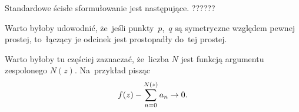 \documentclass[a4paper,11pt]{article}
\begin{document}
Standardowe ścisłe sformułowanie jest następujące. ??????

\vspace{\spaceFour}


\start {} Warto byłoby udowodnić, że~jeśli punkty~$p$,~$q$ są
symetryczne względem pewnej prostej, to~łączący je odcinek jest
prostopadły do~tej prostej.

\vspace{\spaceFour}


\start {}

\vspace{\spaceFour}


\start {} Warto byłoby tu częściej zaznaczać, że~liczba $N$ jest funkcją argumentu zespolonego $N( z )$. Na~przykład pisząc
\begin{equation}
  \label{eq:Leja-30}
  \begin{split}
    f( z ) - \sum\limits_{ n = 0 }^{ N( z ) } a_{ n } \to 0.
  \end{split}
\end{equation}
\end{document}
